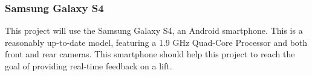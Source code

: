 \subsubsection{Samsung Galaxy S4}

This project will use the Samsung Galaxy S4\cite{s4}, an Android smartphone. This is a reasonably up-to-date model, featuring a 1.9 GHz Quad-Core Processor and both front and rear cameras. This smartphone should help this project to reach the goal of providing real-time feedback on a lift.